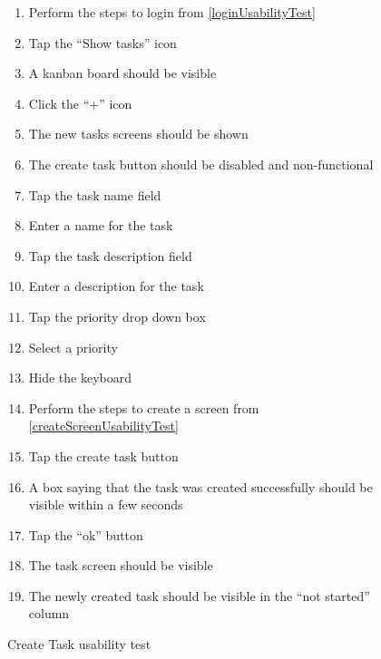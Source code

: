 \begin{figure}[H]
    \begin{enumerate}
        \item Perform the steps to login from \autoref{loginUsabilityTest}

        \item Tap the “Show tasks” icon
        \item A kanban board should be visible
        \item Click the “+” icon
        \item The new tasks screens should be shown
        \item The create task button should be disabled and non-functional 
        \item Tap the task name field
        \item Enter a name for the task
        \item Tap the task description field
        \item Enter a description for the task
        \item Tap the priority drop down box
        \item Select a priority
        \item Hide the keyboard
        \item Perform the steps to create a screen from \autoref{createScreenUsabilityTest}
        \item Tap the create task button
        \item A box saying that the task was created successfully should be visible within a few seconds
        \item Tap the “ok” button
        \item The task screen should be visible
        \item The newly created task should be visible in the “not started” column
    \end{enumerate}
    \caption{Create Task usability test}
    \label{createTaskUsabilityTest}
\end{figure}




